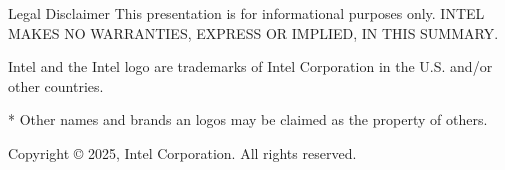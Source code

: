 
\begin{frame}[c]{Legal Disclaimer}
  This presentation is for informational purposes only.
  INTEL MAKES NO WARRANTIES, EXPRESS OR IMPLIED, IN THIS SUMMARY.

  \vspace{\baselineskip}
  Intel and the Intel logo are trademarks of Intel Corporation in the
  U.S. and/or other countries.

  \vspace{\baselineskip}
  * Other names and brands an logos may be claimed as the property of others.

  \vspace{\baselineskip}
  Copyright © 2025, Intel Corporation. All rights reserved.
\end{frame}
